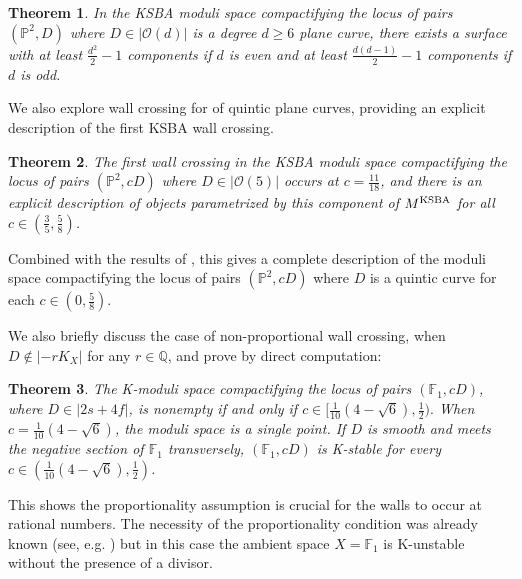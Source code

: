 \documentclass[11pt]{amsart}
\numberwithin{equation}{section}
\newtheorem{theorem}{Theorem}[section]
\theoremstyle{definition}
\newcommand{\bQ}{\mathbb{Q}}
\newcommand{\bF}{\mathbb{F}}
\newcommand{\KSBA}{{\rm KSBA}}
\newcommand{\bP}{\mathbb{P}}
\newcommand{\calO}{\mathcal{O}}
\begin{document}
\begin{theorem}\label{introthm:degensP2}
    In the KSBA moduli space compactifying the locus of pairs $(\bP^2, D)$ where $D \in |\calO(d)|$ is a degree $d \ge 6$ plane curve, there exists a surface with at least $\frac{d^2}{2} -1$ components if $d$ is even and at least $\frac{d(d-1)}{2} -1$ components if $d$ is odd. 
\end{theorem}

We also explore wall crossing for of quintic plane curves, providing an explicit description of the first KSBA wall crossing. 

\begin{theorem}\label{introthm:quintics}
    The first wall crossing in the KSBA moduli space compactifying the locus of pairs $(\bP^2, cD)$ where $D \in |\calO(5)|$ occurs at $c = \frac{11}{18}$, and there is an explicit description of objects parametrized by this component of $M^{\KSBA}$ for all $c \in (\frac{3}{5},\frac{5}{8})$.  
\end{theorem}

Combined with the results of \cite{ADLpub, BABWILD, hacking}, this gives a complete description of the moduli space compactifying the locus of pairs $(\bP^2, cD)$ where $D$ is a quintic curve for each $c \in (0, \frac{5}{8})$.

We also briefly discuss the case of non-proportional wall crossing, when $D \notin |-rK_X|$ for any $r \in \bQ$, and prove by direct computation: 

\begin{theorem}\label{introthm:F1}
    The K-moduli space compactifying the locus of pairs $(\bF_1, c D)$, where $D \in |2s + 4f|$, is nonempty if and only if $c \in [ \frac{1}{10}(4 - \sqrt{6}), \frac{1}{2}).$  When $c = \frac{1}{10}(4 - \sqrt{6})$, the moduli space is a single point.  If $D$ is smooth and meets the negative section of $\bF_1$ transversely, $(\bF_1, cD)$ is K-stable for every $c \in ( \frac{1}{10}(4 - \sqrt{6}), \frac{1}{2})$.
\end{theorem}

This shows the proportionality assumption is crucial for the walls to occur at rational numbers.  The necessity of the proportionality condition was already known (see, e.g. \cite{218}) but in this case the ambient space $X = \bF_1$ is K-unstable without the presence of a divisor.
\end{document}
